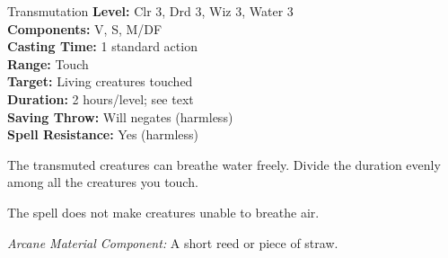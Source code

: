{Transmutation}
{
	\textbf{Level:}
	Clr 3, Drd 3, Wiz 3, Water 3\\
	\textbf{Components:}
	V, S, M/DF\\
	\textbf{Casting Time:}
	1 standard action\\
	\textbf{Range:}
	Touch\\
	\textbf{Target:}
	Living creatures touched\\
	\textbf{Duration:}
	2 hours/level; see text\\
	\textbf{Saving Throw:}
	Will negates (harmless)\\
	\textbf{Spell Resistance:}
	Yes (harmless)\\
}
{
	The transmuted creatures can breathe water freely. Divide the duration evenly among all the creatures you touch.

	The spell does not make creatures unable to breathe air.

	\textit{Arcane Material Component:}
	A short reed or piece of straw.

}
